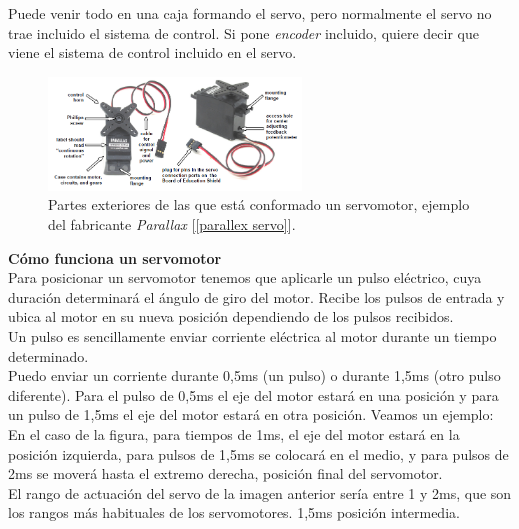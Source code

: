 \documentclass[12pt]{article}
\begin{document}
	\pagebreak

	\noindent Puede venir todo en una caja formando el servo, pero normalmente el servo no trae incluido el sistema de control. Si pone \textit{encoder} incluido, quiere decir que viene el sistema de control incluido en el servo. \\
	
	\begin{figure}[h]
		\begin{center}
			\includegraphics[width=0.6\textwidth]{img/servo_labels.png}
			\caption{Partes exteriores de las que está conformado un servomotor, ejemplo del fabricante \textit{Parallax} [\ref{parallex servo}].}
			\label{parallex labels parts}
		\end{center}
	\end{figure}

	\noindent \textbf{Cómo funciona un servomotor}\\
	
	\noindent Para posicionar un servomotor tenemos que aplicarle un pulso eléctrico, cuya duración determinará el ángulo de giro del motor. Recibe los pulsos de entrada y ubica al motor en su nueva posición dependiendo de los pulsos recibidos. \\
	
	\noindent Un pulso es sencillamente enviar corriente eléctrica al motor durante un tiempo determinado. \\
	
	\noindent Puedo enviar un corriente durante 0,5ms (un pulso) o durante 1,5ms (otro pulso diferente). Para el pulso de 0,5ms el eje del motor estará en una posición y para un pulso de 1,5ms el eje del motor estará en otra posición. Veamos un ejemplo: \\
	
	\noindent En el caso de la figura, para tiempos de 1ms, el eje del motor estará en la posición izquierda, para pulsos de 1,5ms se colocará en el medio, y para pulsos de 2ms se moverá hasta el extremo derecha, posición final del servomotor. \\
	
	\noindent El rango de actuación del servo de la imagen anterior sería entre 1 y 2ms, que son los rangos más habituales de los servomotores. 1,5ms posición intermedia. \\
	
\end{document}
